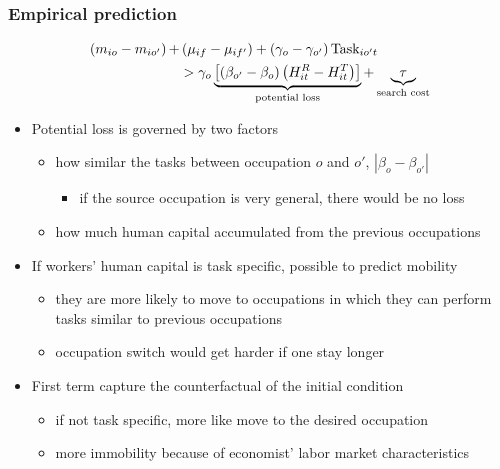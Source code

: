 \documentclass[11pt]{beamer}
\begin{document}
\begin{frame}
	\frametitle{Empirical prediction}
	
	\begin{align}
		\left(m_{io}-m_{io'} \right) + &\left( \mu_{if}-\mu_{if'}\right)+\left( \gamma_o-\gamma_{o'}\right) \text{Task}_{io't} \\
		&>\gamma_o\underbrace{\left[ \left( \beta_{o'} - \beta_{o}\right) \left( H_{it}^R-H_{it}^T\right) \right]}_{\text{potential loss}} +  \underbrace{\tau}_{\text{search cost}} \notag
	\end{align}
	
	\begin{itemize}
		\item Potential loss is governed by two factors
		\begin{itemize}
			\item how similar the tasks between occupation $o$ and $o'$, $|\beta_o-\beta_{o'}|$
			\begin{itemize}
				\item if the source occupation is very general, there would be no loss
			\end{itemize}
			\item how much human capital accumulated from the previous occupations
		\end{itemize}
		\item If workers' human capital is task specific, possible to predict mobility
		\begin{itemize}
			\item they are more likely to move to occupations in which they can perform tasks similar to previous occupations
			\item occupation switch would get harder if one stay longer
		\end{itemize}
		\item First term capture the counterfactual of the initial condition
		\begin{itemize}
			\item if not task specific, more like move to the desired occupation
			\item more immobility because of economist' labor market characteristics
		\end{itemize}
	\end{itemize}
\end{frame}
\end{document}
